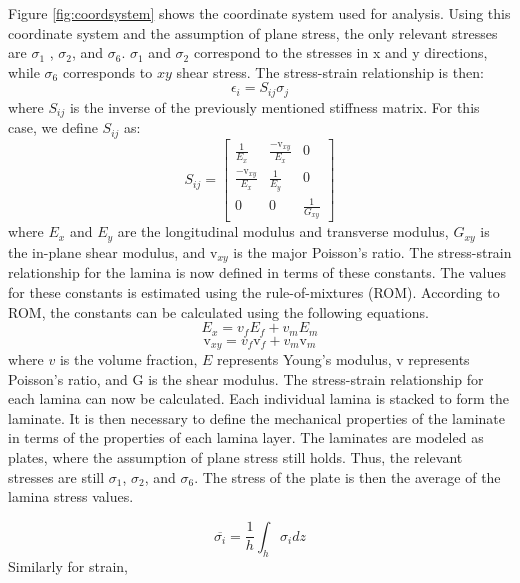Figure \ref{fig:coordsystem} shows the coordinate system used for analysis. Using this coordinate system and the assumption of plane stress, the only relevant stresses are $\sigma_1$ , $\sigma_2$, and $\sigma_6$. $\sigma_1$ and $\sigma_2$ correspond to the stresses in  x and y directions, while $\sigma_6$ corresponds to $xy$ shear stress. The stress-strain relationship is then:
\begin{equation}
    \epsilon_i = S_{ij}\sigma_j
\end{equation}
where $S_{ij}$ is the inverse of the previously mentioned stiffness matrix. For this case, we define $S_{ij}$ as:
\begin{equation}
    S_{ij} = 
    \begin{bmatrix}
    \frac{1}{E_x} & \frac{-\mbox{v}_{xy}}{E_x} & 0 \\
    \frac{-\mbox{v}_{xy}}{E_x} & \frac{1}{E_y} & 0 \\
    0 & 0 & \frac{1}{G_{xy}} 
    \end{bmatrix}
\end{equation}
where $E_x$ and $E_y$ are the longitudinal modulus and transverse modulus, $G_{xy}$ is the in-plane shear modulus, and v$_{xy}$ is the major Poisson's ratio. The stress-strain relationship for the lamina is now defined in terms of these constants. The values for these constants is estimated using the rule-of-mixtures (ROM). According to ROM, the constants can be calculated using the following equations.
\begin{equation}\label{eqn:eight}
    E_x = v_f E_f + v_mE_m
\end{equation}
\begin{equation} \label{eqn:nine}
    \mbox{v}_{xy} = v_f \mbox{v}_f + v_m \mbox{v}_m
\end{equation}
where $v$ is the volume fraction, $E$ represents Young's modulus, v represents Poisson's ratio, and G is the shear modulus. The stress-strain relationship for each lamina can now be calculated. Each individual lamina is stacked to form the laminate. It is then necessary to define the mechanical properties of the laminate in terms of the properties of each lamina layer. The laminates are modeled as plates, where the assumption of plane stress still holds. Thus, the relevant stresses are still $\sigma_1$, $\sigma_2$, and $\sigma_6$. The stress of the plate is then the average of the lamina stress values. 

\begin{equation}
    \overline{\sigma_{i}} = \frac{1}{h} \int_h \sigma_i dz
\end{equation}
Similarly for strain,

